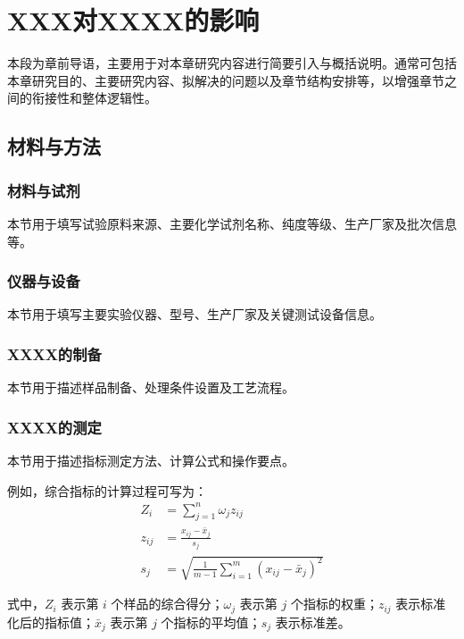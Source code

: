 \chapter{XXX对XXXX的影响}\label{chap:ch2}

本段为章前导语，主要用于对本章研究内容进行简要引入与概括说明。通常可包括本章研究目的、主要研究内容、拟解决的问题以及章节结构安排等，以增强章节之间的衔接性和整体逻辑性。

\section{材料与方法}\label{sec:ch2-methods}

\subsection{材料与试剂}\label{subsec:ch2-materials}

本节用于填写试验原料来源、主要化学试剂名称、纯度等级、生产厂家及批次信息等。

\subsection{仪器与设备}\label{subsec:ch2-instruments}

本节用于填写主要实验仪器、型号、生产厂家及关键测试设备信息。

\subsection{XXXX的制备}\label{subsec:ch2-preparation}

本节用于描述样品制备、处理条件设置及工艺流程。

\subsection{XXXX的测定}\label{subsec:ch2-determination}

本节用于描述指标测定方法、计算公式和操作要点。

例如，综合指标的计算过程可写为：
\begin{align}
	Z_i &= \sum_{j=1}^{n}\omega_j z_{ij} \\
	z_{ij} &= \frac{x_{ij}-\bar{x}_j}{s_j} \\
	s_j &= \sqrt{\frac{1}{m-1}\sum_{i=1}^{m}\left(x_{ij}-\bar{x}_j\right)^2}
	\label{eq:ch2-example}
\end{align}

式中，$Z_i$ 表示第 $i$ 个样品的综合得分；$\omega_j$ 表示第 $j$ 个指标的权重；$z_{ij}$ 表示标准化后的指标值；$\bar{x}_j$ 表示第 $j$ 个指标的平均值；$s_j$ 表示标准差。

